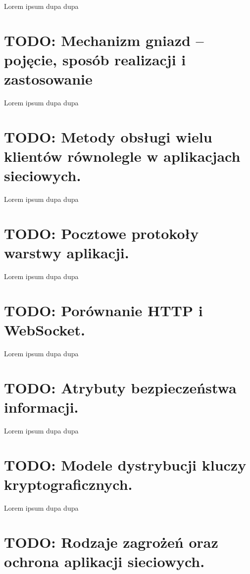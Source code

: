 \documentclass[a4paper,12pt,oneside]{book}
\begin{document}
		Lorem ipsum dupa dupa
		
		\setcounter{section}{58}
		\section{\color{red} TODO: Mechanizm gniazd – pojęcie, sposób realizacji i zastosowanie }
		
		Lorem ipsum dupa dupa
		
		\setcounter{section}{59}
		\section{\color{red} TODO: Metody obsługi wielu klientów równolegle w aplikacjach sieciowych.}
		
		Lorem ipsum dupa dupa
		
		\setcounter{section}{60}
		\section{\color{red} TODO: Pocztowe protokoły warstwy aplikacji. }
		
		Lorem ipsum dupa dupa
		
		\setcounter{section}{61}
		\section{\color{red} TODO: Porównanie HTTP i WebSocket. }
		
		Lorem ipsum dupa dupa
		
		\setcounter{section}{62}
		\section{\color{red} TODO: Atrybuty bezpieczeństwa informacji. }
		
		Lorem ipsum dupa dupa
		
		\setcounter{section}{63}
		\section{\color{red} TODO: Modele dystrybucji kluczy kryptograficznych.}
		
		Lorem ipsum dupa dupa
		
		\setcounter{section}{64}
		\section{\color{red} TODO: Rodzaje zagrożeń oraz ochrona aplikacji sieciowych.}
		
\end{document}
